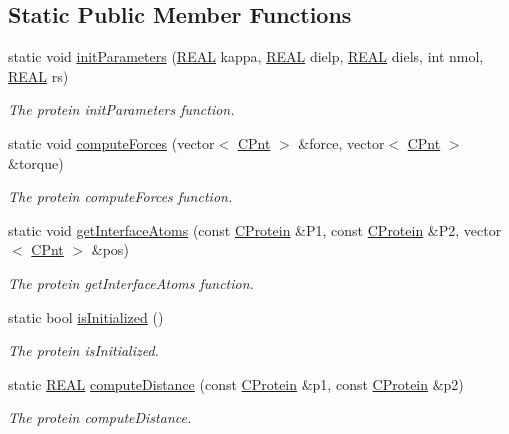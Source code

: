 \subsection*{Static Public Member Functions}
\begin{DoxyCompactItemize}
\item 
static void \hyperlink{classCProtein_aeff60f05cbd42168359f75187b9ac888}{init\-Parameters} (\hyperlink{util_8h_a5821460e95a0800cf9f24c38915cbbde}{R\-E\-A\-L} kappa, \hyperlink{util_8h_a5821460e95a0800cf9f24c38915cbbde}{R\-E\-A\-L} dielp, \hyperlink{util_8h_a5821460e95a0800cf9f24c38915cbbde}{R\-E\-A\-L} diels, int nmol, \hyperlink{util_8h_a5821460e95a0800cf9f24c38915cbbde}{R\-E\-A\-L} rs)
\begin{DoxyCompactList}\small\item\em The protein init\-Parameters function. \end{DoxyCompactList}\item 
static void \hyperlink{classCProtein_a7d6c3fb53c773ea006d123e35301d9b8}{compute\-Forces} (vector$<$ \hyperlink{classCPnt}{C\-Pnt} $>$ \&force, vector$<$ \hyperlink{classCPnt}{C\-Pnt} $>$ \&torque)
\begin{DoxyCompactList}\small\item\em The protein compute\-Forces function. \end{DoxyCompactList}\item 
static void \hyperlink{classCProtein_a2e38b7c42c30f967591fafb5060bc4f7}{get\-Interface\-Atoms} (const \hyperlink{classCProtein}{C\-Protein} \&P1, const \hyperlink{classCProtein}{C\-Protein} \&P2, vector$<$ \hyperlink{classCPnt}{C\-Pnt} $>$ \&pos)
\begin{DoxyCompactList}\small\item\em The protein get\-Interface\-Atoms function. \end{DoxyCompactList}\item 
static bool \hyperlink{classCProtein_a60767b1667e57c9a68045a6c148799cd}{is\-Initialized} ()
\begin{DoxyCompactList}\small\item\em The protein is\-Initialized. \end{DoxyCompactList}\item 
static \hyperlink{util_8h_a5821460e95a0800cf9f24c38915cbbde}{R\-E\-A\-L} \hyperlink{classCProtein_a3d071c05412cb0f2a423920d5ae000dc}{compute\-Distance} (const \hyperlink{classCProtein}{C\-Protein} \&p1, const \hyperlink{classCProtein}{C\-Protein} \&p2)
\begin{DoxyCompactList}\small\item\em The protein compute\-Distance. \end{DoxyCompactList}\end{DoxyCompactItemize}

